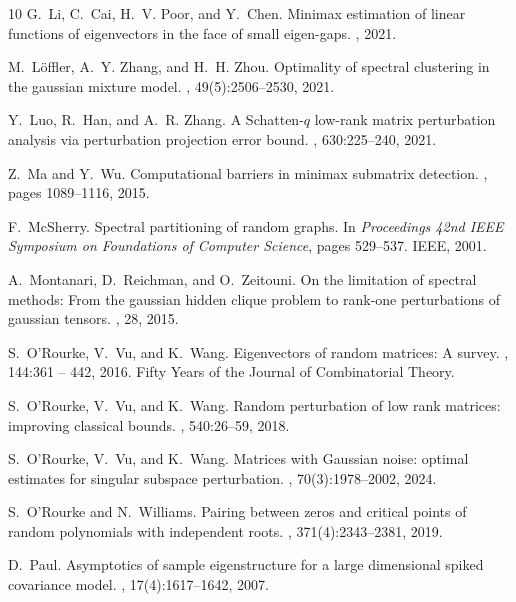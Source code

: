 \documentclass[reqno]{amsart}
\theoremstyle{plain}
\theoremstyle{definition}
\begin{document}
\begin{thebibliography}{10}
G.~Li, C.~Cai, H.~V. Poor, and Y.~Chen.
\newblock Minimax estimation of linear functions of eigenvectors in the face of
  small eigen-gaps.
, 2021.

M.~L{\"o}ffler, A.~Y. Zhang, and H.~H. Zhou.
\newblock Optimality of spectral clustering in the gaussian mixture model.
, 49(5):2506--2530, 2021.

Y.~Luo, R.~Han, and A.~R. Zhang.
\newblock A {S}chatten-$q$ low-rank matrix perturbation analysis via
  perturbation projection error bound.
, 630:225--240, 2021.

Z.~Ma and Y.~Wu.
\newblock Computational barriers in minimax submatrix detection.
, pages 1089--1116, 2015.

F.~McSherry.
\newblock Spectral partitioning of random graphs.
\newblock In {\em Proceedings 42nd IEEE Symposium on Foundations of Computer
  Science}, pages 529--537. IEEE, 2001.

A.~Montanari, D.~Reichman, and O.~Zeitouni.
\newblock On the limitation of spectral methods: From the gaussian hidden
  clique problem to rank-one perturbations of gaussian tensors.
, 28, 2015.

S.~O'Rourke, V.~Vu, and K.~Wang.
\newblock Eigenvectors of random matrices: A survey.
, 144:361 -- 442,
  2016.
\newblock Fifty Years of the Journal of Combinatorial Theory.

S.~O'Rourke, V.~Vu, and K.~Wang.
\newblock Random perturbation of low rank matrices: improving classical bounds.
, 540:26--59, 2018.

S.~O'Rourke, V.~Vu, and K.~Wang.
\newblock Matrices with {G}aussian noise: optimal estimates for singular
  subspace perturbation.
, 70(3):1978--2002,
  2024.

S.~O'Rourke and N.~Williams.
\newblock Pairing between zeros and critical points of random polynomials with
  independent roots.
, 371(4):2343--2381, 2019.

D.~Paul.
\newblock Asymptotics of sample eigenstructure for a large dimensional spiked
  covariance model.
, 17(4):1617--1642, 2007.


\end{thebibliography}
\end{document}
